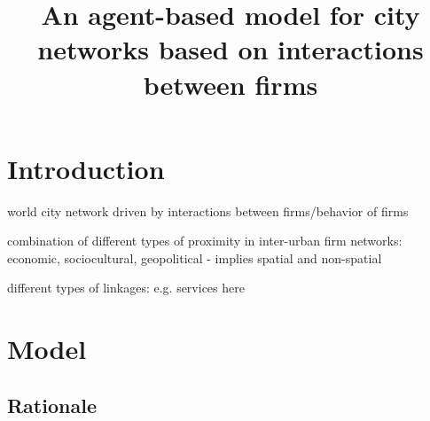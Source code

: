 \documentclass{article}
\title{An agent-based model for city networks based on interactions between firms}
\date{}
\begin{document}
\maketitle

\section{Introduction}

\citep{taylor2001specification} world city network driven by interactions between firms/behavior of firms

\citep{martinus2018global} combination of different types of proximity in inter-urban firm networks: economic, sociocultural, geopolitical - implies spatial and non-spatial 

\citep{pan2017mapping} different types of linkages: e.g. services here



\section{Model}

\subsection{Rationale}
\end{document}
